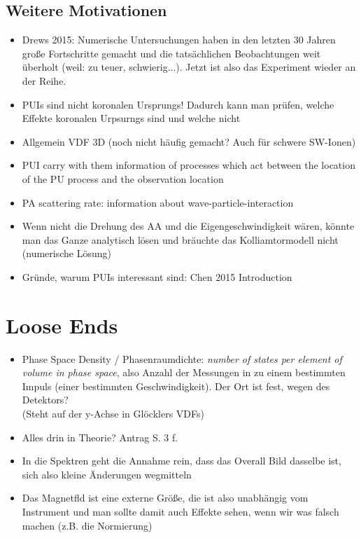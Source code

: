 \documentclass[]{article}
\begin{document}
\subsection{Weitere Motivationen}
\begin{itemize}
	\item Drews 2015: Numerische Untersuchungen haben in den letzten 30 Jahren große Fortschritte gemacht und die tatsächlichen Beobachtungen weit überholt (weil: zu teuer, schwierig...). Jetzt ist also das Experiment wieder an der Reihe. 
	\item PUIs sind nicht koronalen Ursprungs! Dadurch kann man prüfen, welche Effekte koronalen Urpsurngs sind und welche nicht
	\item Allgemein VDF 3D (noch nicht häufig gemacht? Auch für schwere SW-Ionen)
	\item PUI carry with them information of processes which act between the location of the PU process and the observation location
	\item PA scattering rate: information about wave-particle-interaction 
	\item Wenn nicht die Drehung des AA und die Eigengeschwindigkeit wären, könnte man das Ganze analytisch lösen und bräuchte das Kolliamtormodell nicht (numerische Lösung)
	\item Gründe, warum PUIs interessant sind: Chen 2015 Introduction
\end{itemize}
%
%
%
\newpage
\section{Loose Ends}
\begin{itemize}
	\item Phase Space Density / Phasenraumdichte: \textit{number of states per element of volume in phase space}, also Anzahl der Messungen in zu einem bestimmten Impuls (einer bestimmten Geschwindigkeit). Der Ort ist fest, wegen des Detektors?\\
	(Steht auf der y-Achse in Glöcklers VDFs)
	\item Alles drin in Theorie? Antrag S. 3 f.
	\item In die Spektren geht die Annahme rein, dass das Overall Bild dasselbe ist, sich also kleine Änderungen wegmitteln
	\item Das Magnetfld ist eine externe Größe, die ist also unabhängig vom Instrument und man sollte damit auch Effekte sehen, wenn wir was falsch machen (z.B. die Normierung)
\end{itemize}
%
%
%
\newpage
\end{document}

